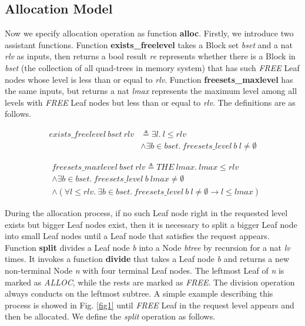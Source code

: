 \subsection{Allocation Model}
Now we specify allocation operation as function \textbf{alloc}. Firstly, we introduce two assistant functions. Function \textbf{exists\_freelevel} takes a Block set \emph{bset} and a nat \emph{rlv} as inputs, then returns a bool result \emph{re} represents whether there is a Block in \emph{bset} (the collection of all quad-trees in memory system) that has such \emph{FREE} Leaf nodes whose level is less than or equal to \emph{rlv}. Function \textbf{freesets\_maxlevel} has the same inputs, but returns a nat \emph{lmax} represents the maximum level among all levels with \emph{FREE} Leaf nodes but less than or equal to \emph{rlv}. The definitions are as follows.

\begin{definition} 
\end{definition}
\vspace{-7pt}
{\footnotesize
\begin{align*}
exists\_freelevel\ bset\ rlv &\triangleq \exists l.\ l \leq rlv \\
&\wedge \exists b \in bset.\ freesets\_level\ b\ l \ne \emptyset
\end{align*}
}
\vspace{-12pt}

\begin{definition} 
\end{definition}
\vspace{-7pt}	
{\footnotesize
\begin{align*}
&freesets\_maxlevel\ bset\ rlv \triangleq THE\ lmax.\ lmax \leq rlv \\
&\wedge \exists b \in bset.\ freesets\_level\ b\ lmax \neq \emptyset \\
&\wedge (\forall l \leq rlv.\ \exists b \in bset.\ freesets\_level\ b\ l \ne \emptyset \longrightarrow l \leq lmax)
\end{align*}
}
\vspace{-12pt}

During the allocation process, if no such Leaf node right in the requested level exists but bigger Leaf nodes exist, then it is necessary to split a bigger Leaf node into small Leaf nodes until a Leaf node that satisfies the request appears. Function \textbf{split} divides a Leaf node \emph{b} into a Node \emph{btree} by recursion for a nat \emph{lv} times. It invokes a function \textbf{divide} that takes a Leaf node \emph{b} and returns a new non-terminal Node \emph{n} with four terminal Leaf nodes. The leftmost Leaf of \emph{n} is marked as \emph{ALLOC}, while the rests are marked as \emph{FREE}. The division operation always conducts on the leftmost subtree. A simple example describing this process is showed in Fig. \ref{fig1} until \emph{FREE} Leaf in the request level appears and then be allocated. We define the \emph{split} operation as follows.

